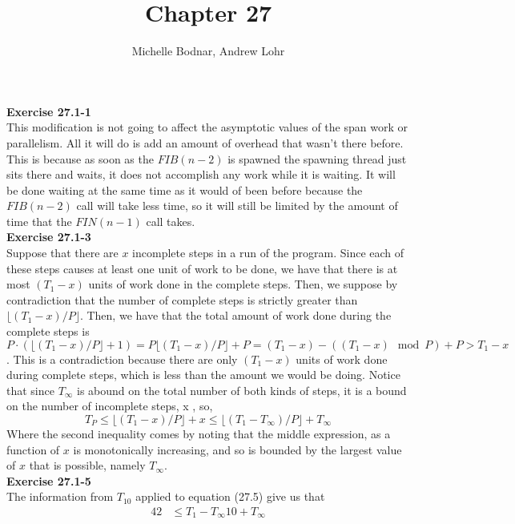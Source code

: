 \documentclass{article}
\title{Chapter 27}
\author{Michelle Bodnar, Andrew Lohr}
\begin{document}
\maketitle
\noindent\textbf{Exercise 27.1-1}\\
This modification is not going to affect the asymptotic values of the span work or parallelism. All it will do is add an amount of overhead that wasn't there before. This is because as soon as the $FIB(n-2)$ is spawned the spawning thread just sits there and waits, it does not accomplish any work while it is waiting. It will be done waiting at the same time as it would of been before because the $FIB(n-2)$ call will take less time, so it will still be limited by the amount of time that the $FIN(n-1)$ call takes.\\



\noindent\textbf{Exercise 27.1-3}\\
Suppose that there are $x$ incomplete steps in a run of the program. Since each of these steps causes at least one unit of work to be done, we have that there is at most $(T_1-x)$ units of work done in the complete steps. Then, we suppose by contradiction that the number of complete steps is strictly greater than $\lfloor (T_1-x)/P\rfloor$. Then, we have that the total amount of work done during the complete steps is $P\cdot (\lfloor (T_1-x)/P\rfloor + 1) = P\lfloor (T_1-x)/P\rfloor +P =  (T_1-x) - ((T_1-x)\mod P) + P > T_1-x$. This is a contradiction because there are only $(T_1-x)$ units of work done during complete steps, which is less than the amount we would be doing. Notice that since $T_\infty$ is abound on the total number of both kinds of steps, it is a bound on the number of incomplete steps, x , so, 
\[
T_P \le \lfloor (T_1-x)/P\rfloor +x \le \lfloor (T_1-T_{\infty})/P\rfloor +T_{\infty} 
\]
Where the second inequality comes by noting that the middle expression, as a function of $x$ is monotonically increasing, and so is bounded by the largest value of $x$ that is possible, namely $T_{\infty}$.\\



\noindent\textbf{Exercise 27.1-5}\\
The information from $T_{10}$ applied to equation (27.5) give us that
\begin{align*}
42 &\le {T_1 - T_\infty}{10} + T_\infty
\end{align*}
\end{document}

